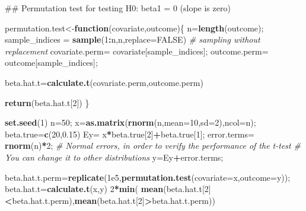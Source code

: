\documentclass[12pt,]{book}
\newenvironment{Shaded}{\begin{snugshade}}{\end{snugshade}}
\newcommand{\KeywordTok}[1]{\textcolor[rgb]{0.13,0.29,0.53}{\textbf{#1}}}
\newcommand{\DataTypeTok}[1]{\textcolor[rgb]{0.13,0.29,0.53}{#1}}
\newcommand{\DecValTok}[1]{\textcolor[rgb]{0.00,0.00,0.81}{#1}}
\newcommand{\FloatTok}[1]{\textcolor[rgb]{0.00,0.00,0.81}{#1}}
\newcommand{\StringTok}[1]{\textcolor[rgb]{0.31,0.60,0.02}{#1}}
\newcommand{\CommentTok}[1]{\textcolor[rgb]{0.56,0.35,0.01}{\textit{#1}}}
\newcommand{\OtherTok}[1]{\textcolor[rgb]{0.56,0.35,0.01}{#1}}
\newcommand{\ControlFlowTok}[1]{\textcolor[rgb]{0.13,0.29,0.53}{\textbf{#1}}}
\newcommand{\OperatorTok}[1]{\textcolor[rgb]{0.81,0.36,0.00}{\textbf{#1}}}
\newcommand{\NormalTok}[1]{#1}
\begin{document}
\begin{Shaded}
\begin{Highlighting}[]
\NormalTok{## Permutation test for testing H0: beta1 = 0 (slope is zero)}

\NormalTok{permutation.test<-}\ControlFlowTok{function}\NormalTok{(covariate,outcome)\{}
\NormalTok{  n=}\KeywordTok{length}\NormalTok{(outcome);}
\NormalTok{  sample_indices =}\StringTok{ }\KeywordTok{sample}\NormalTok{(}\DecValTok{1}\OperatorTok{:}\NormalTok{n,n,}\DataTypeTok{replace=}\OtherTok{FALSE}\NormalTok{) }\CommentTok{# sampling without replacement}
\NormalTok{  covariate.perm=}\StringTok{ }\NormalTok{covariate[sample_indices]; outcome.perm=}\StringTok{ }\NormalTok{outcome[sample_indices];}

\NormalTok{  beta.hat.t=}\KeywordTok{calculate.t}\NormalTok{(covariate.perm,outcome.perm)}

  \KeywordTok{return}\NormalTok{(beta.hat.t[}\DecValTok{2}\NormalTok{])}
\NormalTok{\}}


\KeywordTok{set.seed}\NormalTok{(}\DecValTok{1}\NormalTok{)}
\NormalTok{n=}\DecValTok{50}\NormalTok{;}
\NormalTok{x=}\KeywordTok{as.matrix}\NormalTok{(}\KeywordTok{rnorm}\NormalTok{(n,}\DataTypeTok{mean=}\DecValTok{10}\NormalTok{,}\DataTypeTok{sd=}\DecValTok{2}\NormalTok{),}\DataTypeTok{ncol=}\NormalTok{n);}
\NormalTok{beta.true=}\KeywordTok{c}\NormalTok{(}\DecValTok{20}\NormalTok{,}\FloatTok{0.15}\NormalTok{)}
\NormalTok{Ey=}\StringTok{ }\NormalTok{x}\OperatorTok{*}\NormalTok{beta.true[}\DecValTok{2}\NormalTok{]}\OperatorTok{+}\NormalTok{beta.true[}\DecValTok{1}\NormalTok{];}
\NormalTok{error.terms=}\StringTok{ }\KeywordTok{rnorm}\NormalTok{(n)}\OperatorTok{*}\DecValTok{2}\NormalTok{; }\CommentTok{# Normal errors, in order to verify the performance of the t-test }
\CommentTok{# You can change it to other distributions }
\NormalTok{y=Ey}\OperatorTok{+}\NormalTok{error.terms;}

\NormalTok{beta.hat.t.perm=}\KeywordTok{replicate}\NormalTok{(}\FloatTok{1e5}\NormalTok{,}\KeywordTok{permutation.test}\NormalTok{(}\DataTypeTok{covariate=}\NormalTok{x,}\DataTypeTok{outcome=}\NormalTok{y));}
\NormalTok{beta.hat.t=}\KeywordTok{calculate.t}\NormalTok{(x,y)}
\DecValTok{2}\OperatorTok{*}\KeywordTok{min}\NormalTok{( }\KeywordTok{mean}\NormalTok{(beta.hat.t[}\DecValTok{2}\NormalTok{]}\OperatorTok{<}\NormalTok{beta.hat.t.perm),}\KeywordTok{mean}\NormalTok{(beta.hat.t[}\DecValTok{2}\NormalTok{]}\OperatorTok{>}\NormalTok{beta.hat.t.perm))}
\end{Highlighting}
\end{Shaded}
\end{document}
